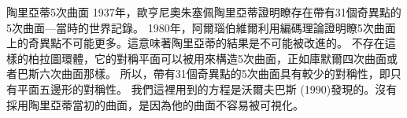 \begin{surferPage}{陶里亞蒂5次曲面}
1937年，歐亨尼奧朱塞佩陶里亞蒂證明瞭存在帶有31個奇異點的5次曲面---當時的世界記錄。
1980年，阿爾瑙伯維爾利用編碼理論證明瞭5次曲面上的奇異點不可能更多。這意味著陶里亞蒂的結果是不可能被改進的。
不存在這樣的柏拉圖環體，它的對稱平面可以被用來構造5次曲面，正如庫默爾四次曲面或者巴斯六次曲面那樣。 所以，帶有31個奇異點的5次曲面具有較少的對稱性，即只有平面五邊形的對稱性。
我們這裡用到的方程是沃爾夫巴斯 (1990)發現的。沒有採用陶里亞蒂當初的曲面，是因為他的曲面不容易被可視化。
\end{surferPage}
